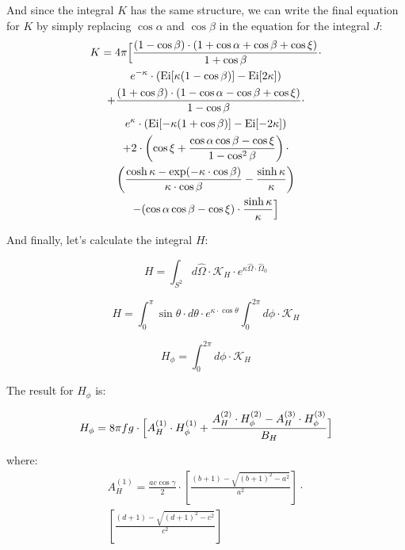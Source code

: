 And since the integral $K$ has the same structure, we can write the final equation for $K$ by simply replacing $\cos\alpha$ and $\cos\beta$ in the equation for the integral $J$:
\begin{multline}
K = 4 \pi \Bigl[ \frac{(1-\cos \beta) \cdot (1 + \cos \alpha + \cos \beta + \cos \xi)}{1 + \cos \beta} \cdot \\
e^{-\kappa} \cdot \left(\text{Ei} [\kappa(1 - \cos \beta)] - \text{Ei}[2\kappa] \right) \\
+ \frac{(1+\cos \beta) \cdot (1 - \cos \alpha - \cos \beta + \cos \xi)}{1 - \cos \beta} \cdot \\ 
e^{\kappa} \cdot \left(\text{Ei} [- \kappa(1 + \cos \beta)] - \text{Ei}[-2\kappa] \right) \\ +  2 \cdot \left(\cos \xi + \frac{\cos \alpha \cos \beta - \cos \xi}{1 - \cos^2 \beta}\right) \cdot \\ \left(\frac{\cosh \kappa - \exp(-\kappa \cdot \cos \beta)}{\kappa \cdot \cos \beta} - \frac{\sinh \kappa}{\kappa} \right) \\ - 
(\cos \alpha \cos \beta - \cos \xi) \cdot \frac{\sinh \kappa}{\kappa} \Bigr]
\end{multline}

And finally, let's calculate the integral $H$:

\begin{equation*}
H = \int_{S^2} d\hat{\Omega} \cdot \mathcal{K}_{H} \cdot e^{\kappa \hat{\Omega} \cdot \hat{\Omega}_0}
\end{equation*}

\begin{equation}
H = \int_{0}^{\pi} \sin \theta \cdot d \theta \cdot e^{\kappa \cdot \cos \theta} \int_{0}^{2\pi} d \phi \cdot \mathcal{K}_{H}
\end{equation}

\begin{equation}
H_{\phi} = \int_{0}^{2\pi} d \phi \cdot \mathcal{K}_{H}
\end{equation}

The result for $H_{\phi}$ is:

\begin{equation}\begin{aligned}
H_{\phi} = 8\pi fg \cdot \Bigl[
  A_H^{(1)} \cdot H_{\phi}^{(1)} + \frac{A_H^{(2)} \cdot H_{\phi}^{(2)} - A_H^{(3)}\cdot H_{\phi}^{(3)}}{B_H}\Bigr]
\end{aligned}\end{equation}

where:
\begin{equation}\begin{aligned}
A_H^{(1)} = \frac{ac \cos \gamma}{2} \cdot \left[\frac{(b+1)-\sqrt{(b+1)^2 - a^2}}{a^2}\right] \cdot  \\ \left[\frac{(d+1)-\sqrt{(d+1)^2 - c^2}}{c^2}\right]
\end{aligned}\end{equation}

